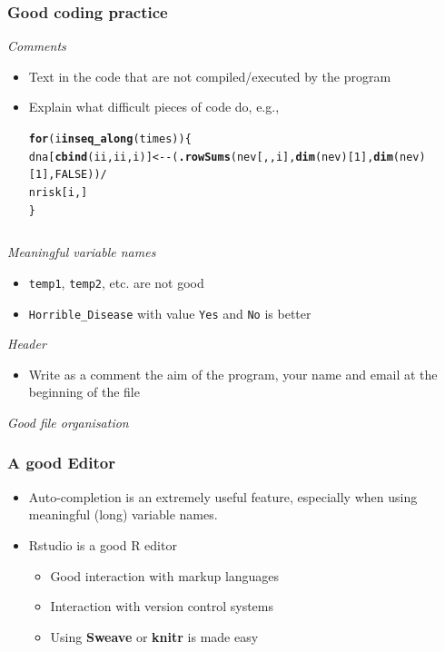 \documentclass[paper=screen,mathserif]{beamer}\usepackage[]{graphicx}\usepackage[]{color}
\makeatletter
\newcommand{\hlnum}[1]{\textcolor[rgb]{0.686,0.059,0.569}{#1}}%
\newcommand{\hlopt}[1]{\textcolor[rgb]{0,0,0}{#1}}%
\newcommand{\hlstd}[1]{\textcolor[rgb]{0.345,0.345,0.345}{#1}}%
\newcommand{\hlkwa}[1]{\textcolor[rgb]{0.161,0.373,0.58}{\textbf{#1}}}%
\newcommand{\hlkwb}[1]{\textcolor[rgb]{0.69,0.353,0.396}{#1}}%
\newcommand{\hlkwd}[1]{\textcolor[rgb]{0.737,0.353,0.396}{\textbf{#1}}}%
\newenvironment{kframe}{%
 \def\at@end@of@kframe{}%
 \ifinner\ifhmode%
  \def\at@end@of@kframe{\end{minipage}}%
  \begin{minipage}{\columnwidth}%
 \fi\fi%
 \def\FrameCommand##1{\hskip\@totalleftmargin \hskip-\fboxsep
 \colorbox{shadecolor}{##1}\hskip-\fboxsep
     \hskip-\linewidth \hskip-\@totalleftmargin \hskip\columnwidth}%
 \MakeFramed {\advance\hsize-\width
   \@totalleftmargin\z@ \linewidth\hsize
   \@setminipage}}%
 {\par\unskip\endMakeFramed%
 \at@end@of@kframe}
\makeatother
\begin{document}
\begin{frame}[fragile]
  \frametitle{Good coding practice}
  {\em Comments}
  \begin{itemize}
  \item Text in the code that are not compiled/executed by the program
  \item Explain what difficult pieces of code do, e.g.,
\begin{kframe}
\begin{alltt}
\hlkwa{for} \hlstd{(i} \hlkwa{in} \hlkwd{seq_along}\hlstd{(times)) \{}
    \hlstd{dna[}\hlkwd{cbind}\hlstd{(ii, ii, i)]} \hlkwb{<-} \hlopt{-}\hlstd{(}\hlkwd{.rowSums}\hlstd{(nev[, , i],} \hlkwd{dim}\hlstd{(nev)[}\hlnum{1}\hlstd{],} \hlkwd{dim}\hlstd{(nev)[}\hlnum{1}\hlstd{],} \hlnum{FALSE}\hlstd{))} \hlopt{/}
        \hlstd{nrisk[i, ]}
\hlstd{\}}
\end{alltt}
\end{kframe}

{\scriptsize
\begin{verbatim}
\end{verbatim}}
  \end{itemize}
  {\em Meaningful variable names}
  \begin{itemize}
  \item {\tt temp1}, {\tt temp2}, etc. are not good
  \item {\tt Horrible\_Disease} with value {\tt Yes} and {\tt No} is
    better
  \end{itemize}
{\em Header}
\begin{itemize}
\item Write as a comment the aim of the program, your name and email
  at the beginning of the file 
\end{itemize}
{\em Good file organisation} 
\end{frame}

\begin{frame}
  \frametitle{A good Editor}
  \begin{itemize}
  \item Auto-completion is an extremely useful feature, especially
    when using meaningful (long) variable names.
  \item Rstudio is a good R editor
    \begin{itemize}
    \item Good interaction with markup languages
    \item Interaction with version control systems
    \item Using {\bf Sweave} or {\bf knitr} is made easy
    \end{itemize}
  \end{itemize}
\end{frame}
\end{document}
